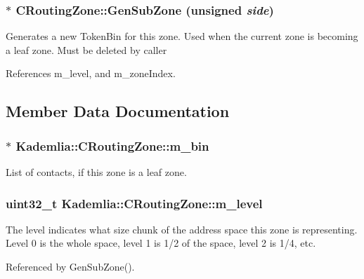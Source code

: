 \subsubsection[{GenSubZone}]{ $\ast$ CRoutingZone::GenSubZone (unsigned {\em side})\hspace{0.3cm}{\ttfamily  [private]}}\label{classKademlia_1_1CRoutingZone_a27e1604a5bf55c41dda05fd031281940}


Generates a new TokenBin for this zone. Used when the current zone is becoming a leaf zone. Must be deleted by caller 

References m\_\-level, and m\_\-zoneIndex.

\subsection{Member Data Documentation}
\subsubsection[{m\_\-bin}]{$\ast$ {\bf Kademlia::CRoutingZone::m\_\-bin}\hspace{0.3cm}{\ttfamily  [private]}}\label{classKademlia_1_1CRoutingZone_ac3a4ffd011c9ba1f5e0d4a0d2572e01e}


List of contacts, if this zone is a leaf zone. 
\subsubsection[{m\_\-level}]{\setlength{\rightskip}{0pt plus 5cm}uint32\_\-t {\bf Kademlia::CRoutingZone::m\_\-level}\hspace{0.3cm}{\ttfamily  [private]}}\label{classKademlia_1_1CRoutingZone_a0f8ca1d8aea35ee765e88e07fecc57dd}


The level indicates what size chunk of the address space this zone is representing. Level 0 is the whole space, level 1 is 1/2 of the space, level 2 is 1/4, etc. 

Referenced by GenSubZone().
